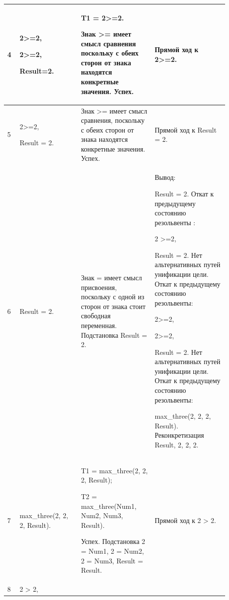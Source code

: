 \documentclass[a4paper,12pt]{article}
\begin{document}
\begin{center}
\begin{longtable}[h!]{|p{0.05\linewidth}|p{0.25\linewidth}|p{ 0.3\linewidth}|p{ 0.3\linewidth}|}
			\hline

			{4} & {2>=2,

			2>=2,

		Result=2.} & {T1 = 2>=2.

	

Знак >= имеет смысл сравнения поскольку с обеих сторон от знака находятся конкретные значения. Успех.} & {Прямой ход к 2>=2.}\\

			\hline

			{5} & {2>=2,

				Result = 2.} & {Знак >= имеет смысл сравнения, поскольку с обеих сторон от знака находятся конкретные значения. Успех.} & {Прямой ход к Result = 2.}\\

			\hline

			{6} & {Result = 2.} & {Знак = имеет смысл присвоения, поскольку с одной из сторон от знака стоит свободная переменная. Подстановка Result = 2.} & {Вывод:

			Result = 2. Откат к предыдущему состоянию резольвенты : 

			

			2 >=2,

			

			Result = 2. Нет альтернативных путей унификации цели. Откат к предыдущему состоянию резольвенты: 

			

			2>=2,

			

			2>=2,

			

			Result = 2. Нет альтернативных путей унификации цели. Откат к предыдущему состоянию резольвенты:

			

			max\_three(2, 2, 2, Result). Реконкретизация Result, 2, 2, 2.}\\

			\hline

			{7} & {max\_three(2, 2, 2, Result).} & {T1 = max\_three(2, 2, 2, Result);

			

		T2 = max\_three(Num1, Num2, Num3, Result).

	

Успех. Подстановка 2 = Num1, 2 = Num2, 2 = Num3, Result = Result.} & {Прямой ход к 2 > 2.}\\

			\hline

			{8} & {2 > 2,

}
\end{longtable}
\end{center}
\end{document}

